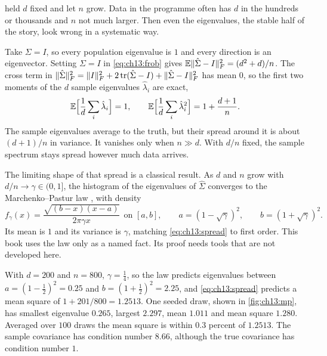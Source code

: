  held $d$ fixed and let $n$ grow. Data in the programme
often has $d$ in the hundreds or thousands and $n$ not much larger. Then even the
eigenvalues, the stable half of the story, look wrong in a systematic way.

Take $\Sigma=I$, so every population eigenvalue is $1$ and every direction is an
eigenvector. Setting $\Sigma=I$ in \cref{eq:ch13:frob} gives
$\mathbb{E}\lVert \hat\Sigma-I\rVert_F^2=(d^2+d)/n$. The cross term in
$\lVert \hat\Sigma\rVert_F^2=\lVert I\rVert_F^2+2\operatorname{tr}(\hat\Sigma-I)+\lVert \hat\Sigma-I\rVert_F^2$ has mean
$0$, so the first two moments of the $d$ sample eigenvalues $\hat\lambda_i$ are exact,
\begin{equation}\label{eq:ch13:spread}
\mathbb{E}\Big[\frac1d\sum_i\hat\lambda_i\Big]=1,\qquad
\mathbb{E}\Big[\frac1d\sum_i\hat\lambda_i^2\Big]=1+\frac{d+1}{n}.
\end{equation}
The sample eigenvalues average to the truth, but their spread around it is
about $(d+1)/n$ in variance. It vanishes only when $n\gg d$. With $d/n$ fixed, the
sample spectrum stays spread however much data arrives.

The limiting shape of that spread is a classical result. As $d$ and $n$ grow with
$d/n\to\gamma\in(0,1]$, the histogram of the eigenvalues of $\hat\Sigma$ converges to
the Marchenko--Pastur law \cite{marchenkopastur1967}, with density
\begin{equation}\label{eq:ch13:mp}
f_\gamma(x)=\frac{\sqrt{(b-x)(x-a)}}{2\pi\gamma x}\ \ \text{on }[a,b],\qquad
a=(1-\sqrt\gamma)^2,\qquad b=(1+\sqrt\gamma)^2 .
\end{equation}
Its mean is $1$ and its variance is $\gamma$, matching \cref{eq:ch13:spread} to
first order. This book uses the law only as a named fact. Its proof needs
tools that are not developed here.

\begin{example}\label{ex:ch13:mp}
With $d=200$ and $n=800$, $\gamma=\tfrac14$, so the law predicts eigenvalues
between $a=(1-\tfrac12)^2=0.25$ and $b=(1+\tfrac12)^2=2.25$, and
\cref{eq:ch13:spread} predicts a mean square of $1+201/800=1.2513$. One seeded
draw, shown in \cref{fig:ch13:mp}, has smallest eigenvalue $0.265$, largest
$2.297$, mean $1.011$ and mean square $1.280$. Averaged over $100$ draws the mean
square is within $0.3$ percent of $1.2513$. The sample covariance has condition
number $8.66$, although the true covariance has condition number $1$.
\end{example}


